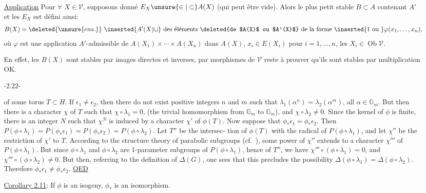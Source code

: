 \uline{Application}  Pour $\forall$ $X\in\mathcal V$, supposons donné $E_X\unsure{\in|\subset} A(X)$ (qui peut être vide).
Alors le plus petit  stable $B\subset A$ contenant $A'$ et les $E_X$ est défini ainsi:
\[
B(X)=\deleted{\unsure{ens.}}\ \inserted{A'(X)\cup}\ \text{des éléments \deleted{de $A(X)$ ou $A'(X)$} de la forme }\inserted{1\text{ ou }}\varphi(x_1,\ldots,x_n),
\]
où $\varphi$ est une application $A'$-admissible de $A(X_1)\times\cdots\times A(X_n)$ dans $A(X)$, $x_i\in E(X_i)$ pour $i=1,\ldots,n$, les $X_i\in\operatorname{Ob}\mathcal V$.

En effet, les $B(X)$  sont stables par images directes et inverses,  par morphismes de $\mathcal V$  reste à prouver qu'ils sont stables par multiplication OK.
\begin{center}-2.22-\end{center}
of some torus $T\subset H$. If $\epsilon_1\neq\epsilon_2$, then there do not exist positive integers $n$ and $m$ such that $\lambda_1(\alpha^n)=\lambda_2(\alpha^m)$, all $\alpha\in\mathbb G_m$. But then there is a character $\chi$ of $T$ such that $\chi\circ\lambda_1=0$, (the trivial homomorphism from $\mathbb G_m$ to $\mathbb G_m$), and $\chi\circ\lambda_2\neq0$. Since the kernel of $\phi$ is finite, there is an integer $N$ such that $\chi^N$ is induced by a character $\chi'$ of $\phi(T)$. Now suppose that $\phi_*\epsilon_1=\phi_*\epsilon_2$. Then $P(\phi\circ\lambda_1)=P(\phi_*\epsilon_1)=P(\phi_*\epsilon_2)=P(\phi\circ\lambda_2)$. Let $T''$ be the intersec-
tion of $\phi(T)$ with the radical of $P(\phi\circ\lambda_1)$, and let $\chi''$ be the restriction of $\chi'$ to $T$. According to the structure theory of parabolic subgroups (cf.\ \hspace{2cm}), some power of $\chi''$ extends to a character $\chi'''$ of $P(\phi\circ\lambda_1)$. But since $\phi\circ\lambda_1$ and $\phi\circ\lambda_2$ are 1-parameter subgroups of $P(\phi\circ\lambda_1)$, hence of $T''$, we have $\chi'''\circ(\phi\circ\lambda_1)=0$, and $\chi'''\circ(\phi\circ\lambda_2)\neq0$. But then, referring to the definition of $\Delta(G)$, one sees that this precludes the possibility $\Delta(\phi\circ\lambda_1)=\Delta(\phi\circ\lambda_2)$. Therefore $\phi_*\epsilon_1\neq\phi_*\epsilon_2$. \uline{QED}

\uline{Corollary 2.11}: If $\phi$ is an isogeny, $\phi_*$ is an isomorphism.

